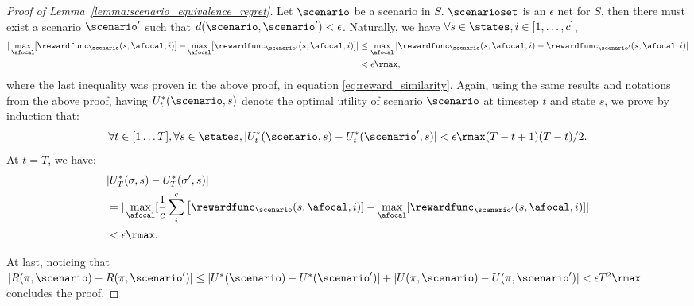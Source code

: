 \begin{proof}[Proof of Lemma~\ref{lemma:scenario_equivalence_regret}]
    Let $\scenario$ be a scenario in $S$. $\scenarioset$ is an $\epsilon$ net for $S$, then there must exist a scenario $\scenario'$ such that $d(\scenario, \scenario')<\epsilon$.
    Naturally, we have $\forall s\in\states, i\in[1,\dots, c]$,
    \begin{align}
        |\max_{\afocal} [\rewardfunc_\scenario(s, \afocal, i)]- \max_{\afocal} [\rewardfunc_{\scenario'}(s, {\afocal}, i)]| &\leq 
        \max_{\afocal} |\rewardfunc_\scenario(s, \afocal, i)-\rewardfunc_{\scenario'}(s, {\afocal}, i)|\\
        & < \epsilon\rmax,
    \end{align}
    where the last inequality was proven in the above proof, in equation \eqref{eq:reward_similarity}.
    Again, using the same results and notations from the above proof, having $U^*_t(\scenario, s)$ denote the optimal utility of scenario $\scenario$ at timestep $t$ and state $s$, we prove by induction that:
    \begin{equation}
        \forall t \in [1\dots T], \forall s \in \states, |U^*_t(\scenario, s)-U^*_t(\scenario', s)| < \epsilon\rmax (T-t+1)(T-t)/2.
    \end{equation}
    At $t = T$, we have:
        \begin{align}
         & |U^*_T(\sigma, s) - U^*_T(\sigma', s)| \\
         &= |\max_{\afocal} [\dfrac{1}{c}\sum_i^c\big[\rewardfunc_\scenario(s, \afocal, i)] - \max_{\afocal}[\rewardfunc_{\scenario'}(s, \afocal, i)]| \\
         & < \epsilon\rmax.
        \end{align}

    At last, noticing that $|R(\pi, \scenario) - R(\pi, \scenario')| \leq |U^*(\scenario) - U^*(\scenario')| + |U(\pi, \scenario) - U(\pi, \scenario')| < \epsilon T^2\rmax$ concludes the proof.
    
\end{proof}
